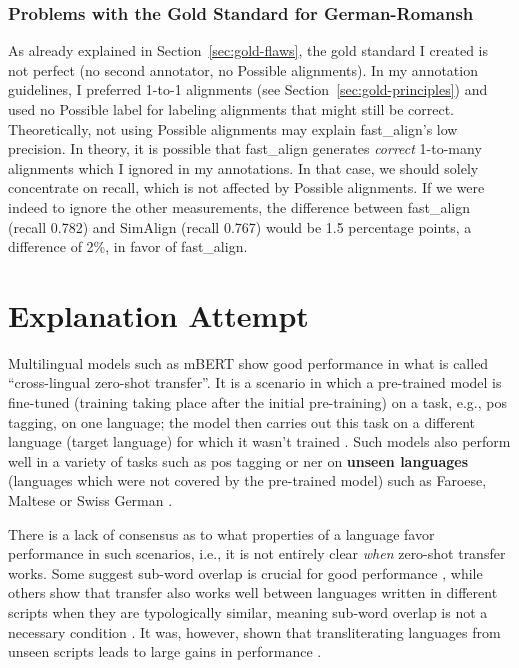 \subsubsection{Problems with the Gold Standard for German-Romansh}
As already explained in Section~\ref{sec:gold-flaws}, the gold standard I created is not perfect (no second annotator, no Possible alignments). 
In my annotation guidelines, I preferred 1-to-1 alignments (see Section~\ref{sec:gold-principles}) and used no Possible label for labeling alignments that might still be correct.
Theoretically, not using Possible alignments may explain fast\_align's low precision. 
In theory, it is possible that fast\_align generates \emph{correct} 1-to-many alignments which I ignored in my annotations. 
In that case, we should solely concentrate on recall, which is not affected by Possible alignments. 
If we were indeed to ignore the other measurements, the difference between fast\_align (recall 0.782) and SimAlign (recall 0.767) would be 1.5 percentage points, a difference of 2\%, in favor of fast\_align.



\section{Explanation Attempt}\label{sec:explanation}
Multilingual models such as mBERT show good performance in what is called \enquote{cross-lingual zero-shot transfer}. 
It is a scenario in which a pre-trained model is fine-tuned (training taking place after the initial pre-training) on a task, e.g., \acrshort{pos} tagging, on one language; the model then carries out this task on a different language (target language) for which it wasn't trained \autocite{deshpande-etal-2022-bert}.
Such models also perform well in a variety of tasks such as \acrshort{pos} tagging or \acrshort{ner} on \textbf{unseen languages} (languages which were not covered by the pre-trained model) such as Faroese, Maltese or Swiss German \autocite{muller-et-al-2020}.

There is a lack of consensus as to what properties of a language favor performance in such scenarios, i.e., it is not entirely clear  \emph{when} zero-shot transfer works. 
Some suggest sub-word overlap is crucial for good performance \autocite{wu-dredze-2019-beto}, while others show that transfer also works well between languages written in different scripts when they are typologically similar\footnotemark{}, meaning sub-word overlap is not a necessary condition \autocite{pires-etal-2019-multilingual}.  It was, however, shown that transliterating languages from unseen scripts leads to large gains in performance \autocite{muller-et-al-2020}.

